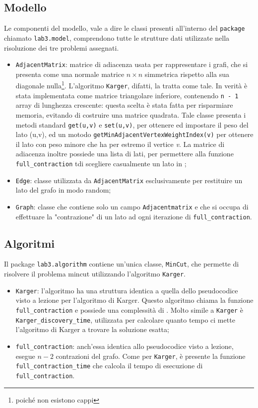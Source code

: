 \subsection{Modello}
Le componenti del modello, vale a dire le classi presenti all'interno del \texttt{package} chiamato \texttt{lab3.model}, comprendono tutte le strutture dati utilizzate nella risoluzione dei tre problemi assegnati. 
\begin{itemize}
	\item \label{adjmat}\texttt{AdjacentMatrix}: matrice di adiacenza usata per rappresentare i grafi, che si presenta come una normale matrice $n\times n$ simmetrica rispetto alla sua diagonale nulla\footnote{poiché non esistono cappi}. L'algoritmo \texttt{Karger}, difatti, la tratta come tale. In verità è stata implementata come matrice triangolare inferiore, contenendo \texttt{n - 1} array di lunghezza crescente: questa scelta è stata fatta per risparmiare memoria, evitando di costruire una matrice quadrata. Tale classe presenta i metodi standard \texttt{get(u,v)} e \texttt{set(u,v)}, per ottenere ed impostare il peso del lato (u,v), ed un motodo \texttt{getMinAdjacentVertexWeightIndex(v)} per ottenere il lato con peso minore che ha per estremo il vertice \textit{v}. La matrice di adiacenza inoltre possiede una lista di lati, per permettere alla funzione \texttt{full\_contraction} tdi scegliere casualmente un lato in ;
	\item \texttt{Edge}: classe utilizzata da \texttt{AdjacentMatrix} esclusivamente per restituire un lato del grafo in modo random;
	\item \texttt{Graph}: classe che contiene solo un campo \texttt{Adjacentmatrix} e che si occupa di effettuare la "contrazione" di un lato ad ogni iterazione di \texttt{full\_contraction}.
\end{itemize} 

\subsection{Algoritmi}
Il package \texttt{lab3.algorithm} contiene un'unica classe, \texttt{MinCut}, che permette di risolvere il problema mincut utilizzando l'algoritmo \texttt{Karger}.
\begin{itemize}
	\item \texttt{Karger}: l'algoritmo ha una struttura identica a quella dello pseudocodice visto a lezione per l'algoritmo di Karger. Questo algoritmo chiama la funzione \texttt{full\_contraction} e possiede una complessità di . Molto simile a \texttt{Karger} è \texttt{Karger\_discovery\_time}, utilizzata per calcolare quanto tempo ci mette l'algoritmo di Karger a trovare la soluzione esatta;
	\item \texttt{full\_contraction}: anch'essa identica allo pseudocodice visto a lezione, esegue $n-2$ contrazioni del grafo. Come per \texttt{Karger}, è presente la funzione \texttt{full\_contraction\_time} che calcola il tempo di esecuzione di \texttt{full\_contraction}.
\end{itemize}

